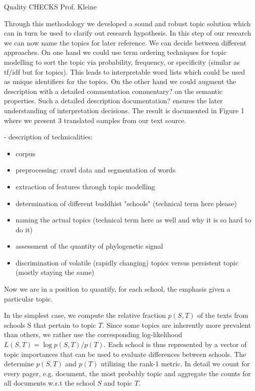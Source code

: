 \documentclass[a4paper,10pt]{article}
\newcommand{\TODO}[1]{\begingroup\color{red}#1\endgroup}
\newcommand{\NR}[1]{\begingroup\color{orange}#1\endgroup}
\begin{document}
Quality CHECKS Prof. Kleine

Through this methodology we developed a sound and robust topic solution which can in turn
be used to clarify out research hypothesis. In this step of our research we can now name
the topics for later reference. We can decide between different approaches. On one hand 
we could use term ordering techniques for topic modelling to sort the topic via 
probability, frequency, or specificity (similar as tf/idf but for topics). This leads to 
interpretable word lists which could be used as unique identifiers for the topics. On
the other hand we could augment the description with a detailed commentation \NR{commentary?} on the 
semantic properties. Such a detailed description \NR{documentation?} ensures the later understanding of 
interpretation decisions. The result is documented in \TODO{Figure 1} where we present 3 
translated samples from our text source.

- description of technicalities:
\begin{itemize}
 \item corpus
 \item preprocessing: crawl data and segmentation of words
 \item extraction of features through topic modelling
 \item determination of different buddhist "schools" (technical term here please)
 \item naming the actual topics (technical term here as well and why it is so hard to do it)
 \item assessment of the quantity of phylogenetic signal
 \item discrimination of volatile (rapidly changing) topics versus persistent topic 
  (mostly staying the same) 
\end{itemize}


Now we are in a position to quantify, for each school, the emphasis given a particular 
topic. 


In the simplest case, we compute the relative fraction $p(S,T)$ of the texts from schools S 
that pertain to topic $T$. Since some topics are inherently more prevalent than others, we 
rather use the corresponding log-likelihood $L(S,T) = \log p(S,T)/p(T)$. Each \TODO{school} is thus
represented by a vector of topic importances that can be used to evaluate differences 
between \TODO{schools}. The determine $p(S,T)$ and $p(T)$ utilizing the rank-1 metric. In detail we 
count for every pager, e.g. document, the most probably topic and aggregate the counts 
for all documents w.r.t the school $S$ and topic $T$. 
\end{document}
